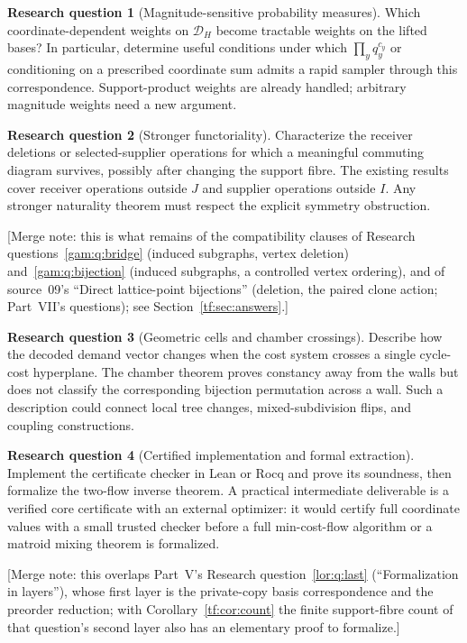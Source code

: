 \documentclass[11pt]{article}
\numberwithin{equation}{section}
\theoremstyle{definition}
\newtheorem{question}{Research question}%
\newcommand{\cD}{\mathcal D}
\begin{document}
\begin{question}[Magnitude-sensitive probability measures]\label{tf:q:magnitude}
Which coordinate-dependent weights on $\cD_H$ become tractable weights on
the lifted bases? In particular, determine useful conditions under which
$\prod_yq_y^{c_y}$ or conditioning on a prescribed coordinate sum admits
a rapid sampler through this correspondence. Support-product weights are
already handled; arbitrary magnitude weights need a new argument.
\end{question}

\begin{question}[Stronger functoriality]\label{tf:q:functoriality}
Characterize the receiver deletions or selected-supplier operations for
which a meaningful commuting diagram survives, possibly after changing
the support fibre. The existing results cover receiver operations outside
$J$ and supplier operations outside $I$. Any stronger naturality theorem
must respect the explicit symmetry obstruction.
\end{question}
[Merge note: this is what remains of the compatibility clauses of
Research questions~\ref{gam:q:bridge} (induced subgraphs, vertex
deletion) and~\ref{gam:q:bijection} (induced subgraphs, a controlled
vertex ordering), and of source~09's ``Direct lattice-point bijections''
(deletion, the paired clone action; Part~VII's questions); see
Section~\ref{tf:sec:answers}.]

\begin{question}[Geometric cells and chamber crossings]\label{tf:q:chambers}
Describe how the decoded demand vector changes when the cost system
crosses a single cycle-cost hyperplane. The chamber theorem proves
constancy away from the walls but does not classify the corresponding
bijection permutation across a wall. Such a description could connect
local tree changes, mixed-subdivision flips, and coupling constructions.
\end{question}

\begin{question}[Certified implementation and formal extraction]\label{tf:q:formal}
Implement the certificate checker in Lean or Rocq and prove its soundness,
then formalize the two-flow inverse theorem. A practical intermediate
deliverable is a verified core certificate with an external optimizer:
it would certify full coordinate values with a small trusted checker
before a full min-cost-flow algorithm or a matroid mixing theorem is
formalized.
\end{question}
[Merge note: this overlaps Part~V's Research question~\ref{lor:q:last}
(``Formalization in layers''), whose first layer is the private-copy basis
correspondence and the preorder reduction; with
Corollary~\ref{tf:cor:count} the finite support-fibre count of that
question's second layer also has an elementary proof to formalize.]
\end{document}
